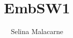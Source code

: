 \documentclass[titlepage=true]{scrartcl}
\title{EmbSW1}
\author{Selina Malacarne}
\begin{document}
\begin{titlepage}
   \thispagestyle{empty}
   \maketitle
\end{titlepage}

\tableofcontents%

%

\end{document}
